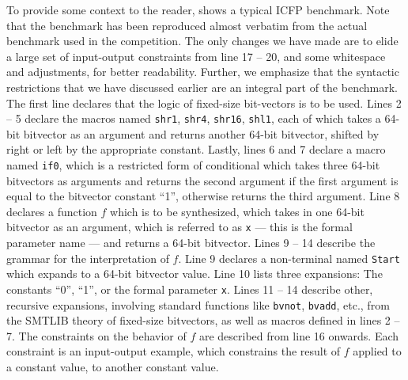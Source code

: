To provide some context to the reader,  shows a
typical ICFP benchmark. Note that the benchmark has been reproduced
almost verbatim from the actual benchmark used in the \sygusbody
competition. The only changes we have made are to elide a large set of
input-output constraints from line 17 -- 20, and some whitespace and
adjustments, for better readability. Further, we emphasize that the
syntactic restrictions that we have discussed earlier are an integral
part of the benchmark. The first line declares that the
logic of fixed-size bit-vectors is to be used. Lines 2 -- 5 declare
the macros named \texttt{shr1}, \texttt{shr4}, \texttt{shr16},
\texttt{shl1}, each of which takes a 64-bit bitvector as an argument
and returns another 64-bit bitvector, shifted by right or left by the
appropriate constant. Lastly, lines 6 and 7 declare a macro named
\texttt{if0}, which is a restricted form of conditional which takes
three 64-bit bitvectors as arguments and returns the second argument
if the first argument is equal to the bitvector constant ``1'',
otherwise returns the third argument. Line 8 declares a function $f$
which is to be synthesized, which takes in one 64-bit bitvector as an
argument, which is referred to as \texttt{x} --- this is the formal
parameter name --- and returns a 64-bit bitvector. Lines 9 -- 14
describe the grammar for the interpretation of $f$. Line 9 declares a
non-terminal named \texttt{Start} which expands to a 64-bit bitvector
value. Line 10 lists three expansions: The constants ``0'', ``1'', or
the formal parameter \texttt{x}. Lines 11 -- 14 describe other,
recursive expansions, involving standard functions like
\texttt{bvnot}, \texttt{bvadd}, etc., from the SMTLIB theory of
fixed-size bitvectors, as well as macros defined in lines 2 -- 7. The
constraints on the behavior of $f$ are described from line 16
onwards. Each constraint is an input-output example, which constrains
the result of $f$ applied to a constant value, to another constant
value.

